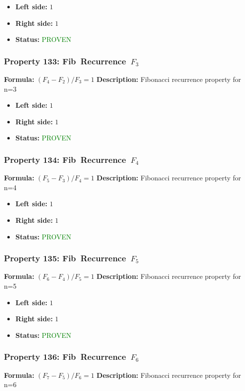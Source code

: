 \begin{itemize}
\item \textbf{Left side:} $1$
\item \textbf{Right side:} $1$
\item \textbf{Status:} \textcolor{green}{PROVEN}
\end{itemize}

\subsubsection*{Property 133: Fib~Recurrence~$F_{3}$}
\textbf{Formula:} $(F_4-F_2)/F_3=1$
\textbf{Description:} Fibonacci recurrence property for n=3

\begin{itemize}
\item \textbf{Left side:} $1$
\item \textbf{Right side:} $1$
\item \textbf{Status:} \textcolor{green}{PROVEN}
\end{itemize}

\subsubsection*{Property 134: Fib~Recurrence~$F_{4}$}
\textbf{Formula:} $(F_5-F_3)/F_4=1$
\textbf{Description:} Fibonacci recurrence property for n=4

\begin{itemize}
\item \textbf{Left side:} $1$
\item \textbf{Right side:} $1$
\item \textbf{Status:} \textcolor{green}{PROVEN}
\end{itemize}

\subsubsection*{Property 135: Fib~Recurrence~$F_{5}$}
\textbf{Formula:} $(F_6-F_4)/F_5=1$
\textbf{Description:} Fibonacci recurrence property for n=5

\begin{itemize}
\item \textbf{Left side:} $1$
\item \textbf{Right side:} $1$
\item \textbf{Status:} \textcolor{green}{PROVEN}
\end{itemize}

\subsubsection*{Property 136: Fib~Recurrence~$F_{6}$}
\textbf{Formula:} $(F_7-F_5)/F_6=1$
\textbf{Description:} Fibonacci recurrence property for n=6


